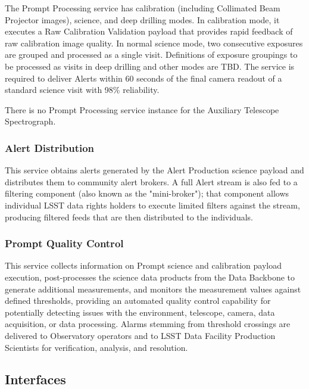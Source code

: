 \documentclass[DM,toc,lsstdraft]{lsstdoc}
\begin{document}
The Prompt Processing service has calibration (including Collimated Beam
Projector images), science, and deep drilling modes. In calibration
mode, it executes a Raw Calibration Validation payload that provides
rapid feedback of raw calibration image quality. In normal science mode,
two consecutive exposures are grouped and processed as a single visit.
Definitions of exposure groupings to be processed as visits in deep
drilling and other modes are TBD. The service is required to deliver
Alerts within 60 seconds of the final camera readout of a standard
science visit with 98\% reliability.

There is no Prompt Processing service instance for the Auxiliary
Telescope Spectrograph.

\subsubsection{Alert Distribution}\label{alert-distribution}

This service obtains alerts generated by the Alert Production science payload and distributes them to community alert brokers.
A full Alert stream is also fed to a filtering component (also known as the "mini-broker"); that component allows individual LSST data rights holders to execute limited filters against the stream, producing filtered feeds that are then distributed to the individuals.

\subsubsection{Prompt Quality Control}\label{prompt-quality-control}

This service collects information on Prompt science and calibration
payload execution, post-processes the science data products from the
Data Backbone to generate additional measurements, and monitors the
measurement values against defined thresholds, providing an automated
quality control capability for potentially detecting issues with the
environment, telescope, camera, data acquisition, or data processing.
Alarms stemming from threshold crossings are delivered to Observatory
operators and to LSST Data Facility Production Scientists for
verification, analysis, and resolution.

\subsection{Interfaces}\label{prompt-ncsa-interfaces}
\end{document}
